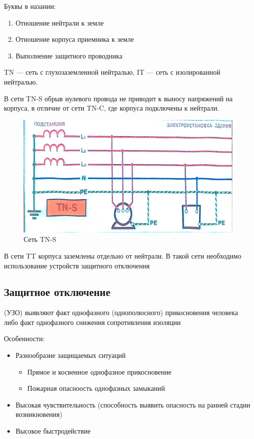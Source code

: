 \documentclass[a4paper, 14pt]{extarticle}
\begin{document}
Буквы в назании:
\begin{enumerate}
    \item Отношение нейтрали к земле
    \item Отношение корпуса приемника к земле 
    \item Выполнение защитного проводника
\end{enumerate}

TN --- сеть с глухозаземленной нейтралью, IT --- сеть с изолированной нейтралью.

В сети TN-S обрыв нулевого провода не приводит к выносу напряжений на корпуса, в отличие от сети TN-C, где корпуса подключены к нейтрали.

\begin{figure}[h]
    \centering
    \includegraphics[width=\textwidth]{./img/L5/S005.jpg}
    \caption{Сеть TN-S}
\end{figure}

В сети TT корпуса заземлены отдельно от нейтрали. В такой сети необходимо использование устройств защитного отключения

\subsection{Защитное отключение}
 (УЗО) выявляют факт однофазного (однополюсного) прикосновения человека либо факт однофазного снижения сопротивления изоляции

Особенности:
\begin{itemize}
    \item Разнообразие защищаемых ситуаций
    \begin{itemize}
        \item Прямое и косвенное однофазное прикосновение
        \item Пожарная опасноость однофазных замыканий
    \end{itemize}
    \item Высокая чувствительность (способность выявить опасность на ранней стадии возникновения)
    \item Высокое быстродействие
\end{itemize}
\end{document}
